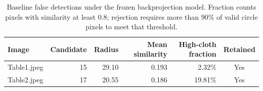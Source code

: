 \begin{table}[htbp]
\centering
\small
\caption{Baseline false detections under the frozen backprojection model. Fraction counts pixels with similarity at least 0.8; rejection requires more than 90\% of valid circle pixels to meet that threshold.}
\label{tab:backprojection-false-candidates}
\begin{tabular}{lrrrrc}
\toprule
Image & Candidate & Radius & Mean similarity & High-cloth fraction & Retained \\
\midrule
Table1.jpeg & 15 & 29.10 & 0.193 & 2.32\% & Yes \\
Table2.jpeg & 17 & 20.55 & 0.186 & 19.81\% & Yes \\
\bottomrule
\end{tabular}
\end{table}
\FloatBarrier
